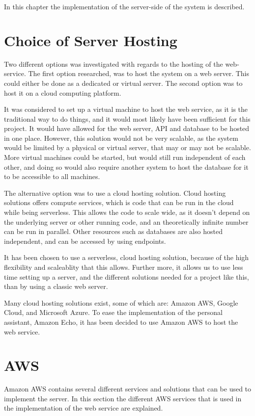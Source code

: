 In this chapter the implementation of the server-side of the system is described. 

\section{Choice of Server Hosting}
Two different options was investigated with regards to the hosting of the web-service. The first option researched, was to host the system on a web server. This could either be done as a dedicated or virtual server. The second option was to host it on a cloud computing platform.

It was considered to set up a virtual machine to host the web service, as it is the traditional way to do things, and it would most likely have been sufficient for this project. It would have allowed for the web server, API and database to be hosted in one place. However, this solution would not be very scalable, as the system would be limited by a physical or virtual server, that may or may not be scalable. More virtual machines could be started, but would still run independent of each other, and doing so would also require another system to host the database for it to be accessible to all machines.

The alternative option was to use a cloud hosting solution. Cloud hosting solutions offers compute services, which is code that can be run in the cloud while being serverless. This allows the code to scale wide, as it doesn't depend on the underlying server or other running code, and an theoretically infinite number can be run in parallel. Other resources such as databases are also hosted independent, and can be accessed by using endpoints.

It has been chosen to use a serverless, cloud hosting solution, because of the high flexibility and scaleablity that this allows. Further more, it allows us to use less time setting up a server, and the different solutions needed for a project like this, than by using a classic web server.

Many cloud hosting solutions exist, some of which are: Amazon AWS, Google Cloud, and Microsoft Azure. To ease the implementation of the personal assistant, Amazon Echo, it has been decided to use Amazon AWS to host the web service.

\section{AWS}
\label{sec:aws}
Amazon AWS contains several different services and solutions that can be used to implement the server. In this section the different AWS services that is used in the implementation of the web service are explained.

